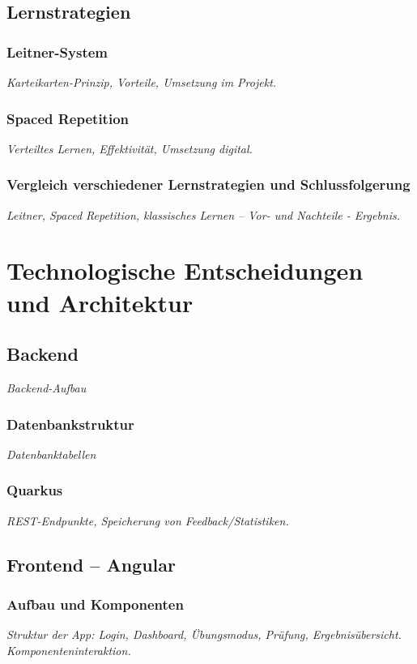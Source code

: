 \documentclass[12pt,a4paper,titlepage,listof=totoc,bibliography=totoc,chapteratlists=0pt]{scrreprt}
\begin{document}
\begin{spacing}{1}
\section{Lernstrategien}
\setauthor{\secondauthor}

\subsection{Leitner-System}
\textit{Karteikarten-Prinzip, Vorteile, Umsetzung im Projekt.}

\subsection{Spaced Repetition}
\textit{Verteiltes Lernen, Effektivität, Umsetzung digital.}

\subsection{Vergleich verschiedener Lernstrategien und Schlussfolgerung}
\textit{Leitner, Spaced Repetition, klassisches Lernen – Vor- und Nachteile - Ergebnis.}

\chapter{Technologische Entscheidungen und Architektur}

\section{Backend}
\textit{Backend-Aufbau}

\subsection{Datenbankstruktur}
\textit{Datenbanktabellen}

\subsection{Quarkus}
\textit{REST-Endpunkte, Speicherung von Feedback/Statistiken.}

\section{Frontend – Angular}

\subsection{Aufbau und Komponenten}
\textit{Struktur der App: Login, Dashboard, Übungsmodus, Prüfung, Ergebnisübersicht. Komponenteninteraktion.}


\end{spacing}
\end{document}
